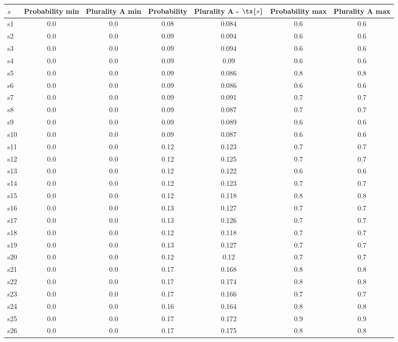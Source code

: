 \documentclass{article}
\begin{document}
\noindent\begin{tabular}{|l|c|c|c|c|c|c|}
\hline
$s$& Probability min & Plurality A min & Probability & Plurality A - $\ts{s}$ & Probability max & Plurality A max\\
\hline
s1 &0.0 & 0.0 & 0.08 & 0.084 & 0.6 & 0.6\\
\hline
s2 &0.0 & 0.0 & 0.09 & 0.094 & 0.6 & 0.6\\
\hline
s3 &0.0 & 0.0 & 0.09 & 0.094 & 0.6 & 0.6\\
\hline
s4 &0.0 & 0.0 & 0.09 & 0.09 & 0.6 & 0.6\\
\hline
s5 &0.0 & 0.0 & 0.09 & 0.086 & 0.8 & 0.8\\
\hline
s6 &0.0 & 0.0 & 0.09 & 0.086 & 0.6 & 0.6\\
\hline
s7 &0.0 & 0.0 & 0.09 & 0.091 & 0.7 & 0.7\\
\hline
s8 &0.0 & 0.0 & 0.09 & 0.087 & 0.7 & 0.7\\
\hline
s9 &0.0 & 0.0 & 0.09 & 0.089 & 0.6 & 0.6\\
\hline
s10 &0.0 & 0.0 & 0.09 & 0.087 & 0.6 & 0.6\\
\hline
s11 &0.0 & 0.0 & 0.12 & 0.123 & 0.7 & 0.7\\
\hline
s12 &0.0 & 0.0 & 0.12 & 0.125 & 0.7 & 0.7\\
\hline
s13 &0.0 & 0.0 & 0.12 & 0.122 & 0.6 & 0.6\\
\hline
s14 &0.0 & 0.0 & 0.12 & 0.123 & 0.7 & 0.7\\
\hline
s15 &0.0 & 0.0 & 0.12 & 0.118 & 0.8 & 0.8\\
\hline
s16 &0.0 & 0.0 & 0.13 & 0.127 & 0.7 & 0.7\\
\hline
s17 &0.0 & 0.0 & 0.13 & 0.126 & 0.7 & 0.7\\
\hline
s18 &0.0 & 0.0 & 0.12 & 0.118 & 0.7 & 0.7\\
\hline
s19 &0.0 & 0.0 & 0.13 & 0.127 & 0.7 & 0.7\\
\hline
s20 &0.0 & 0.0 & 0.12 & 0.12 & 0.7 & 0.7\\
\hline
s21 &0.0 & 0.0 & 0.17 & 0.168 & 0.8 & 0.8\\
\hline
s22 &0.0 & 0.0 & 0.17 & 0.174 & 0.8 & 0.8\\
\hline
s23 &0.0 & 0.0 & 0.17 & 0.166 & 0.7 & 0.7\\
\hline
s24 &0.0 & 0.0 & 0.16 & 0.164 & 0.8 & 0.8\\
\hline
s25 &0.0 & 0.0 & 0.17 & 0.172 & 0.9 & 0.9\\
\hline
s26 &0.0 & 0.0 & 0.17 & 0.175 & 0.8 & 0.8\\

\end{tabular}
\end{document}
